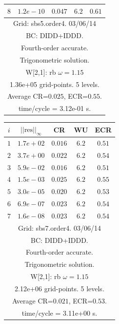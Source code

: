 \begin{table}[hbt]
\begin{center}
{\begin{tabular}{|c|c|c|c|c|}
 $ 8$  & $ 1.2e-10$ & $0.047$ & $ 6.2$ & $0.61$ \\ 
\hline 
\multicolumn{5}{|c|}{Grid: sbs5.order4. 03/06/14}  \\
\multicolumn{5}{|c|}{BC: DIDD+IDDD.}  \\
\multicolumn{5}{|c|}{Fourth-order accurate.}  \\
\multicolumn{5}{|c|}{Trigonometric solution.}  \\
\multicolumn{5}{|c|}{W[2,1]: rb $\omega=1.15$}  \\
\multicolumn{5}{|c|}{1.36e+05 grid-points. 5 levels.}  \\
\multicolumn{5}{|c|}{Average CR=$0.025$, ECR=$0.55$.}  \\
\multicolumn{5}{|c|}{time/cycle = 3.12e-01 s.}  \\
\hline 
\end{tabular}
\begin{tabular}{|c|c|c|c|c|} \hline 
 $i$   & $\vert\vert\mbox{res}\vert\vert_\infty$  &  CR     &  WU    & ECR  \\   \hline 
 $ 1$  & $ 1.7e+02$ & $0.016$ & $ 6.2$ & $0.51$ \\ 
 $ 2$  & $ 3.7e+00$ & $0.022$ & $ 6.2$ & $0.54$ \\ 
 $ 3$  & $ 5.9e-02$ & $0.016$ & $ 6.2$ & $0.51$ \\ 
 $ 4$  & $ 1.5e-03$ & $0.025$ & $ 6.2$ & $0.55$ \\ 
 $ 5$  & $ 3.0e-05$ & $0.020$ & $ 6.2$ & $0.53$ \\ 
 $ 6$  & $ 6.9e-07$ & $0.023$ & $ 6.2$ & $0.54$ \\ 
 $ 7$  & $ 1.6e-08$ & $0.023$ & $ 6.2$ & $0.54$ \\ 
\hline 
\multicolumn{5}{|c|}{Grid: sbs7.order4. 03/06/14}  \\
\multicolumn{5}{|c|}{BC: DIDD+IDDD.}  \\
\multicolumn{5}{|c|}{Fourth-order accurate.}  \\
\multicolumn{5}{|c|}{Trigonometric solution.}  \\
\multicolumn{5}{|c|}{W[2,1]: rb $\omega=1.15$}  \\
\multicolumn{5}{|c|}{2.12e+06 grid-points. 5 levels.}  \\
\multicolumn{5}{|c|}{Average CR=$0.021$, ECR=$0.53$.}  \\
\multicolumn{5}{|c|}{time/cycle = 3.11e+00 s.}  \\
\hline 
\end{tabular}
\begin{tabular}{|c|c|c|c|c|} \hline 

\end{tabular}}
\end{center}
\end{table}
